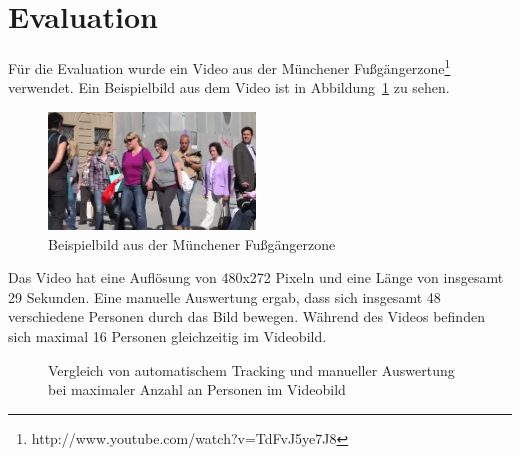 \documentclass[a4paper, 11pt, twocolumn]{article}
\begin{document}

\section{Evaluation} %
\label{sec:evaluation}

Für die Evaluation wurde ein Video aus der Münchener Fußgängerzone\footnote{http://www.youtube.com/watch?v=TdFvJ5ye7J8} verwendet. Ein Beispielbild aus dem Video ist in Abbildung~\ref{fig:fussgaenger_muenchen} zu sehen.

\begin{figure}[tb]
	\begin{center}
		\includegraphics[width=0.49\textwidth]{fussgaenger1.png}
	\end{center}
	\caption{Beispielbild aus der Münchener Fußgängerzone}
	\label{fig:fussgaenger_muenchen}
\end{figure}
	
Das Video hat eine Auflösung von 480x272 Pixeln und eine Länge von insgesamt 29 Sekunden. Eine manuelle Auswertung ergab, dass sich insgesamt 48 verschiedene Personen durch das Bild bewegen. Während des Videos befinden sich maximal 16 Personen gleichzeitig im Videobild. 

\begin{figure}[t]
	\hfill
	\caption{Vergleich von automatischem Tracking und manueller Auswertung bei maximaler Anzahl an Personen im Videobild}
	\label{fig:maxanzahl_fussgaenger}
\end{figure}
\end{document}
